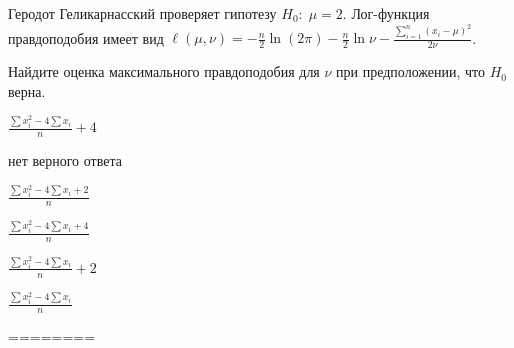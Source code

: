 
\begin{question}
Геродот Геликарнасский проверяет гипотезу \(H_0: \; \mu=2\). Лог-функция
правдоподобия имеет вид
\(\ell(\mu,\nu)=-\frac{n}{2}\ln (2\pi)-\frac{n}{2}\ln \nu -\frac{\sum_{i=1}^n(x_i-\mu)^2}{2\nu}\).

Найдите оценка максимального правдоподобия для \(\nu\) при
предположении, что \(H_0\) верна.
\begin{answerlist}
  \item \(\frac{\sum x_i^2 - 4\sum x_i}{n}+4\)
  \item нет верного ответа
  \item \(\frac{\sum x_i^2 - 4\sum x_i+2}{n}\)
  \item \(\frac{\sum x_i^2 - 4\sum x_i+4}{n}\)
  \item \(\frac{\sum x_i^2 - 4\sum x_i}{n}+2\)
  \item \(\frac{\sum x_i^2 - 4\sum x_i}{n}\)
\end{answerlist}
\end{question}

\begin{solution}
========
\end{solution}

